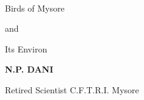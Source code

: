 ~\phantom{a}
\vfill

\thispagestyle{empty}

\begin{center}
{\Huge\bsifamily Birds of Mysore}\relax

\bigskip
{\Huge\bsifamily and}\relax

\smallskip
\bigskip
{\Huge\bsifamily Its Environ}\relax
\end{center}

\vfill

\begin{center}
{\bf N.P. DANI}

\smallskip
{Retired Scientist C.F.T.R.I. Mysore}
\end{center}
\newpage

